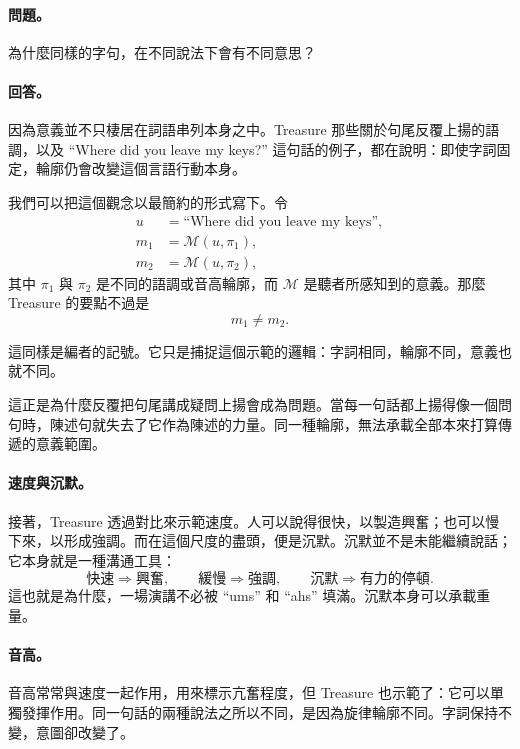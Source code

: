 \paragraph{問題。} 為什麼同樣的字句，在不同說法下會有不同意思？

\paragraph{回答。} 因為意義並不只棲居在詞語串列本身之中。Treasure 那些關於句尾反覆上揚的語調，以及 ``Where did you leave my keys?'' 這句話的例子，都在說明：即使字詞固定，輪廓仍會改變這個言語行動本身。

我們可以把這個觀念以最簡約的形式寫下。令
\begin{align}
u &= \text{``Where did you leave my keys''},\\
m_1 &= \mathcal{M}(u,\pi_1),\\
m_2 &= \mathcal{M}(u,\pi_2),
\end{align}
其中 \(\pi_1\) 與 \(\pi_2\) 是不同的語調或音高輪廓，而 \(\mathcal{M}\) 是聽者所感知到的意義。那麼 Treasure 的要點不過是
\begin{equation}
m_1 \neq m_2.
\end{equation}

\begin{remark}
這同樣是編者的記號。它只是捕捉這個示範的邏輯：字詞相同，輪廓不同，意義也就不同。
\end{remark}

這正是為什麼反覆把句尾講成疑問上揚會成為問題。當每一句話都上揚得像一個問句時，陳述句就失去了它作為陳述的力量。同一種輪廓，無法承載全部本來打算傳遞的意義範圍。

\paragraph{速度與沉默。} 接著，Treasure 透過對比來示範速度。人可以說得很快，以製造興奮；也可以慢下來，以形成強調。而在這個尺度的盡頭，便是沉默。沉默並不是未能繼續說話；它本身就是一種溝通工具：
\begin{equation}
\text{快速} \Rightarrow \text{興奮},
\qquad
\text{緩慢} \Rightarrow \text{強調},
\qquad
\text{沉默} \Rightarrow \text{有力的停頓}.
\end{equation}
這也就是為什麼，一場演講不必被 ``ums'' 和 ``ahs'' 填滿。沉默本身可以承載重量。

\paragraph{音高。} 音高常常與速度一起作用，用來標示亢奮程度，但 Treasure 也示範了：它可以單獨發揮作用。同一句話的兩種說法之所以不同，是因為旋律輪廓不同。字詞保持不變，意圖卻改變了。

